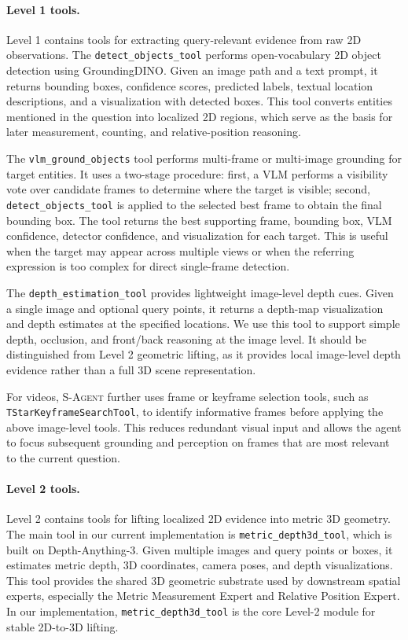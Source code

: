 \documentclass{llmxive}
\begin{document}
\paragraph{Level 1 tools.}
Level 1 contains tools for extracting query-relevant evidence from raw 2D observations. 
The \texttt{detect\_objects\_tool} performs open-vocabulary 2D object detection using GroundingDINO. 
Given an image path and a text prompt, it returns bounding boxes, confidence scores, predicted labels, textual location descriptions, and a visualization with detected boxes. 
This tool converts entities mentioned in the question into localized 2D regions, which serve as the basis for later measurement, counting, and relative-position reasoning.

The \texttt{vlm\_ground\_objects} tool performs multi-frame or multi-image grounding for target entities. 
It uses a two-stage procedure: first, a VLM performs a visibility vote over candidate frames to determine where the target is visible; second, \texttt{detect\_objects\_tool} is applied to the selected best frame to obtain the final bounding box. 
The tool returns the best supporting frame, bounding box, VLM confidence, detector confidence, and visualization for each target. 
This is useful when the target may appear across multiple views or when the referring expression is too complex for direct single-frame detection.

The \texttt{depth\_estimation\_tool} provides lightweight image-level depth cues. 
Given a single image and optional query points, it returns a depth-map visualization and depth estimates at the specified locations. 
We use this tool to support simple depth, occlusion, and front/back reasoning at the image level. 
It should be distinguished from Level 2 geometric lifting, as it provides local image-level depth evidence rather than a full 3D scene representation.

For videos, \textsc{S-Agent} further uses frame or keyframe selection tools, such as \texttt{TStarKeyframeSearchTool}, to identify informative frames before applying the above image-level tools. 
This reduces redundant visual input and allows the agent to focus subsequent grounding and perception on frames that are most relevant to the current question.

\paragraph{Level 2 tools.}
Level 2 contains tools for lifting localized 2D evidence into metric 3D geometry. 
The main tool in our current implementation is \texttt{metric\_depth3d\_tool}, which is built on Depth-Anything-3. 
Given multiple images and query points or boxes, it estimates metric depth, 3D coordinates, camera poses, and depth visualizations. 
This tool provides the shared 3D geometric substrate used by downstream spatial experts, especially the Metric Measurement Expert and Relative Position Expert. 
In our implementation, \texttt{metric\_depth3d\_tool} is the core Level-2 module for stable 2D-to-3D lifting.
\end{document}
